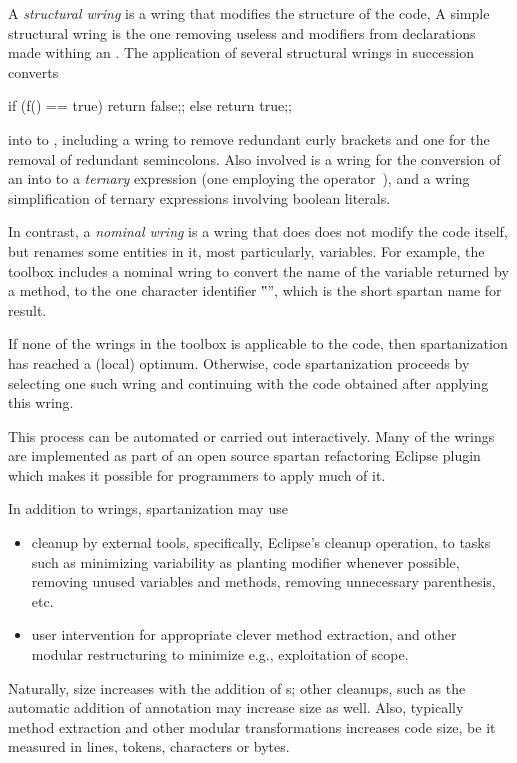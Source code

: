 A \emph{structural wring} is a wring that modifies the structure of the code,
A simple structural wring is the one removing
useless  and  modifiers from
declarations made withing an .
The application of several structural wrings in succession converts
\begin{java}
if (f() == true) {
  return false;;
} else {
  return true;;
}
\end{java}
into to , including a wring to remove redundant
curly brackets and one for the removal of redundant semincolons. 
Also involved is a wring for the conversion of an  into to a
\emph{ternary} expression (one employing the operator~), and a
wring simplification of ternary expressions involving boolean literals.

In contrast, a \emph{nominal wring} is a wring that does does not modify the
code itself, but renames some entities in it, most particularly, variables.
For example, the toolbox includes a nominal wring to convert the name of the
variable returned by a method, to the one character identifier ‟\cc{\$}”,
which is the short spartan name for result.

If none of the wrings in the toolbox is applicable to the code, then
spartanization has reached a (local) optimum. Otherwise, code spartanization
proceeds by selecting one such wring and continuing with the code obtained
after applying this wring.

This process can be automated or carried out interactively. Many of the wrings
are implemented as part of an open source spartan refactoring Eclipse
plugin which
makes it possible for programmers to apply much of it.

In addition to wrings, spartanization may use
\begin{itemize}
    \item cleanup by external tools, specifically, Eclipse's cleanup operation,
      to tasks such as minimizing variability as planting  modifier
      whenever possible, removing unused variables and methods, removing
      unnecessary parenthesis, etc.  
    \item user intervention for appropriate
        clever method extraction, and other modular restructuring to 
        minimize e.g., exploitation of scope.
\end{itemize}
Naturally, size increases with the addition of s; other cleanups, such
as the automatic addition of  annotation may increase size as well.
Also, typically method extraction and other modular transformations increases
code size, be it measured in lines, tokens, characters or bytes.

